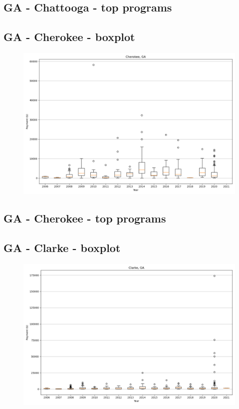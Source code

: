 \subsection*{GA - Chattooga - top programs}

\newpage
\subsection*{GA - Cherokee - boxplot}
\begin{figure}[h]
\centering
\includegraphics[width=7in]{../output/boxplots/counties/Cherokee-GA_boxplot.png}
\end{figure}


\subsection*{GA - Cherokee - top programs}

\newpage
\subsection*{GA - Clarke - boxplot}
\begin{figure}[h]
\centering
\includegraphics[width=7in]{../output/boxplots/counties/Clarke-GA_boxplot.png}
\end{figure}


